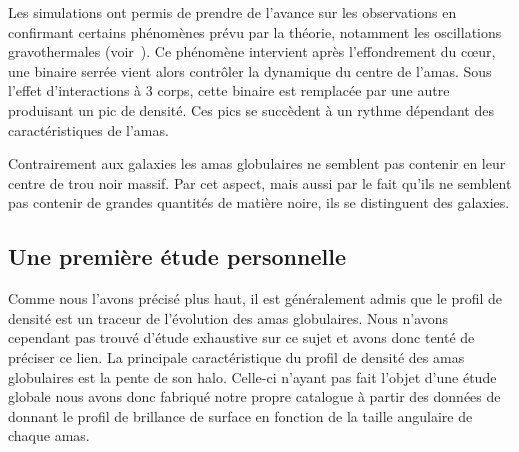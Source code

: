 			Les simulations ont permis de prendre de l'avance sur les observations en
			confirmant certains phénomènes prévu par la théorie, notamment
			les oscillations gravothermales (voir~\cite{1996ApJ...471..796M}). Ce phénomène
			intervient après l'effondrement du cœur, une binaire serrée vient alors
			contrôler la dynamique du centre de l'amas. Sous l'effet d'interactions à 3
			corps, cette binaire est remplacée par une autre produisant un pic de
			densité. Ces pics se succèdent à un rythme dépendant des caractéristiques de
			l'amas.

			Contrairement aux galaxies les amas globulaires ne semblent pas contenir
			en leur centre de trou noir massif. Par cet aspect, mais
			aussi par le fait qu'ils ne semblent pas contenir de grandes quantités de
			matière noire, ils se distinguent des galaxies.

		\subsection{Une première étude personnelle}

			Comme nous l'avons précisé plus haut, il est généralement admis que le
			profil de densité est un traceur de l'évolution des amas globulaires. Nous
			n'avons cependant pas trouvé d'étude exhaustive sur ce sujet et avons donc
			tenté de préciser ce lien.
			La principale caractéristique du profil de densité des amas globulaires est
			la pente de son halo. Celle-ci n'ayant pas fait l'objet d'une étude globale nous
			avons donc fabriqué notre propre catalogue à partir des données
			de~\cite{Trager-graphe} donnant le profil de brillance de surface en fonction de la taille angulaire
			de chaque amas.



				
